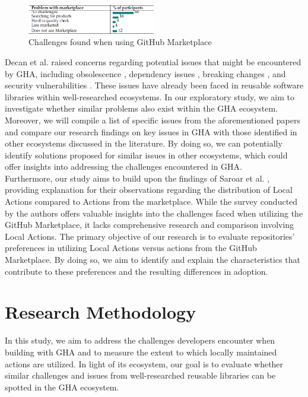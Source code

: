 \documentclass[conference]{IEEEtran}
\begin{document}
\begin{figure} [h]
\includegraphics[width=0.5\textwidth]{Table 1.png}
\caption{Challenges found when using GitHub Marketplace \cite{saroar2023developers} }
\end{figure}
	Decan et al. \cite{decan2022use} raised concerns regarding potential issues that might be encountered by GHA, including obsolescence \cite{decan2018evolution} \cite{cogo2021deprecation}, dependency issues \cite{decan2019empirical} \cite{soto2021comprehensive} \cite{decan2019package}, breaking changes \cite{dietrich2019dependency} \cite{decan2018impact}, and security vulnerabilities \cite{zimmermann2019small} \cite{kula2018developers}. These issues have already been faced in reusable software libraries within well-researched ecosystems. In our exploratory study, we aim to investigate whether similar problems also exist within the GHA ecosystem. Moreover, we will compile a list of specific issues from the aforementioned papers and compare our research findings on key issues in GHA with those identified in other ecosystems discussed in the literature. By doing so, we can potentially identify solutions proposed for similar issues in other ecosystems, which could offer insights into addressing the challenges encountered in GHA.\\
	Furthermore, our study aims to build upon the findings of Saroar et al. \cite{saroar2023developers}, providing explanation for their observations regarding the distribution of Local Actions compared to Actions from the marketplace. While the survey conducted by the authors offers valuable insights into the challenges faced when utilizing the GitHub Marketplace, it lacks comprehensive research and comparison involving Local Actions. The primary objective of our research is to evaluate repositories' preferences in utilizing Local Actions versus actions from the GitHub Marketplace. By doing so, we aim to identify and explain the characteristics that contribute to these preferences and the resulting differences in adoption.


\section{Research Methodology}
    In this study, we aim to address the challenges developers encounter when building with GHA and to measure the extent to which locally maintained actions are utilized. In light of its ecosystem, our goal is to evaluate whether similar challenges and issues from well-researched reusable libraries can be spotted in the GHA ecosystem.\\
\end{document}

